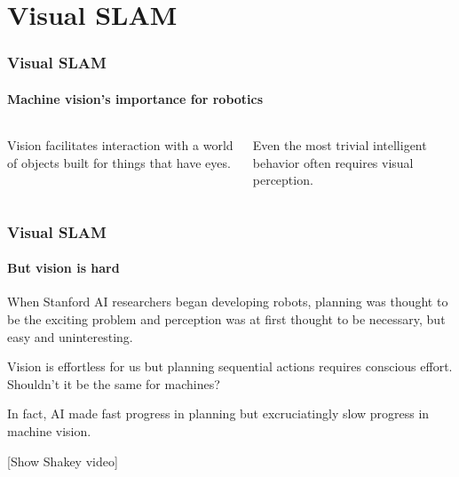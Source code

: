 \documentclass[aspectratio=169]{beamer}
\newcommand{\myfig}[3]{\centerline{\texttt{[image: \#2]}}
    \centerline{\scriptsize \begin{minipage}{#1} \centering #3 \end{minipage}}}
\begin{document}
\section{Visual SLAM}

\begin{frame}
\frametitle{Visual SLAM}
\framesubtitle{Machine vision's importance for robotics}


\medskip

\begin{columns}

\column{5in}

Vision facilitates \alert{interaction} with a world of objects built
for things that have eyes.

\medskip

Even the most trivial \alert{intelligent behavior} often requires
visual perception.

\end{columns}

\end{frame}


\begin{frame}
\frametitle{Visual SLAM}
\framesubtitle{But vision is hard}

When Stanford AI researchers began developing robots, \alert{planning} was
thought to be the exciting problem and \alert{perception} was at first
thought to be necessary, but easy and uninteresting.

\medskip

Vision is \alert{effortless} for us but planning sequential actions requires
\alert{conscious effort}.  Shouldn't it be the same for machines?

\medskip

In fact, AI made fast progress in planning but excruciatingly slow progress
in machine vision.

\medskip

\alert{[Show Shakey video]}

\end{frame}
\end{document}
